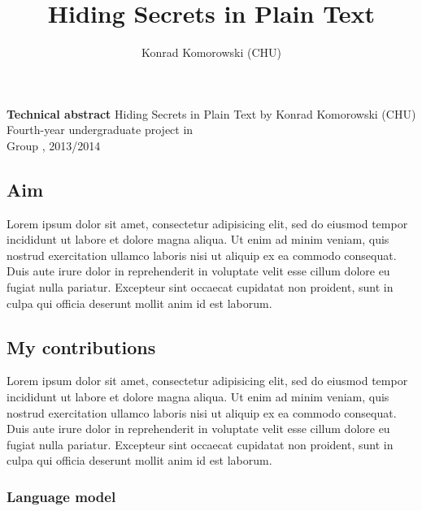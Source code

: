 \documentclass[draft]{IIBproject}
\begin{document}
\pagestyle{empty}

\def \theauthor {Konrad Komorowski (CHU)}
\def \thetitle {Hiding Secrets in Plain Text}
\author{\theauthor}
\title{\thetitle}
\maketitle
\cleardoublepage

\pagestyle{plain}

\begin{center}
\mbox{}
\large \textbf{Technical abstract}
\vskip 1cm
\Large \thetitle
\vskip 0cm
\normalsize by
\vskip 0cm
\large \theauthor
\vskip 0.3cm
\normalsize Fourth-year undergraduate project in \\ Group \theprojectgroup, 2013/2014
\vskip 1cm
\end{center}
\normalsize

\subsection*{Aim}

Lorem ipsum dolor sit amet, consectetur adipisicing elit, sed do eiusmod tempor incididunt ut labore et dolore magna aliqua. Ut enim ad minim veniam, quis nostrud exercitation ullamco laboris nisi ut aliquip ex ea commodo consequat. Duis aute irure dolor in reprehenderit in voluptate velit esse cillum dolore eu fugiat nulla pariatur. Excepteur sint occaecat cupidatat non proident, sunt in culpa qui officia deserunt mollit anim id est laborum.

\subsection*{My contributions}

Lorem ipsum dolor sit amet, consectetur adipisicing elit, sed do eiusmod tempor incididunt ut labore et dolore magna aliqua. Ut enim ad minim veniam, quis nostrud exercitation ullamco laboris nisi ut aliquip ex ea commodo consequat. Duis aute irure dolor in reprehenderit in voluptate velit esse cillum dolore eu fugiat nulla pariatur. Excepteur sint occaecat cupidatat non proident, sunt in culpa qui officia deserunt mollit anim id est laborum.

\subsubsection*{Language model}
\end{document}
